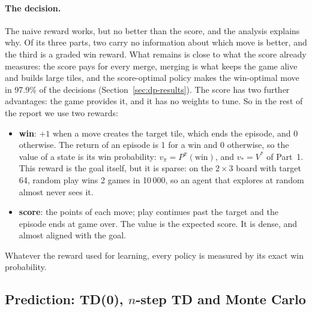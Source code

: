 \documentclass[11pt,a4paper]{article}
\theoremstyle{remark}
\begin{document}
\paragraph{The decision.} The naive reward works, but no better than the score, and the analysis explains why. Of its three parts, two carry no information about which move is better, and the third is a graded win reward. What remains is close to what the score already measures: the score pays for every merge, merging is what keeps the game alive and builds large tiles, and the score-optimal policy makes the win-optimal move in 97.9\% of the decisions (Section~\ref{sec:dp-results}). The score has two further advantages: the game provides it, and it has no weights to tune. So in the rest of the report we use two rewards:
\begin{itemize}[leftmargin=*]
\item \textbf{win}: $+1$ when a move creates the target tile, which ends the episode, and 0 otherwise. The return of an episode is 1 for a win and 0 otherwise, so the value of a state is its win probability: $v_\pi=P^\pi(\text{win})$, and $v_*=V^*$ of Part~1. This reward is the goal itself, but it is sparse: on the $2\times3$ board with target 64, random play wins 2 games in 10\,000, so an agent that explores at random almost never sees it.
\item \textbf{score}: the points of each move; play continues past the target and the episode ends at game over. The value is the expected score. It is dense, and almost aligned with the goal.
\end{itemize}
Whatever the reward used for learning, every policy is measured by its exact win probability.

\subsection{Prediction: TD(0), $n$-step TD and Monte Carlo}
\label{sec:prediction}
\end{document}
